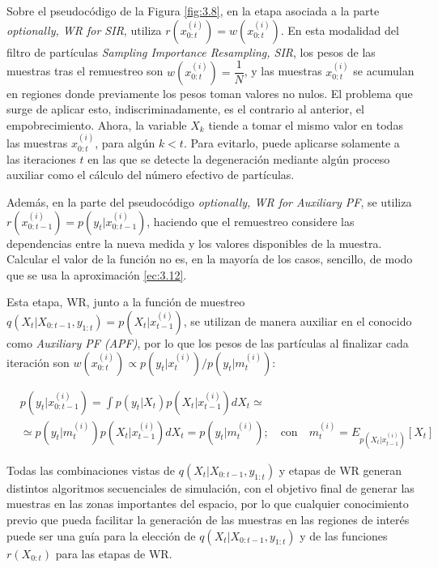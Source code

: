 Sobre el pseudocódigo de la Figura \ref{fig:3.8}, en la etapa asociada a la parte \textit{optionally, WR for SIR}, utiliza $r\left(x_{0:t}^{(i)}\right) = w\left(x_{0:t}^{(i)}\right)$. En esta modalidad del filtro de partículas \textit{Sampling Importance Resampling, SIR}, los pesos de las muestras tras el remuestreo son $w\left(x_{0:t}^{(i)}\right) = \dfrac{1}{N}$, y las muestras $x_{0:t}^{(i)}$ se acumulan en regiones donde previamente los pesos toman valores no nulos.
El problema que surge de aplicar esto, indiscriminadamente, es el contrario al anterior, el empobrecimiento. Ahora, la variable $X_k$ tiende a tomar el mismo valor en todas las muestras $x_{0:t}^{(i)}$, para algún $k < t$. Para evitarlo, puede aplicarse solamente a las iteraciones $t$ en las que se detecte la degeneración mediante algún proceso auxiliar como el cálculo del número efectivo de partículas.

Además, en la parte del pseudocódigo \textit{optionally, WR for Auxiliary PF}, se utiliza $r\left(x_{0:t-1}^{(i)}\right) = p\left(y_t|x_{0:t-1}^{(i)}\right)$, haciendo que el remuestreo considere las dependencias entre la nueva medida y los valores disponibles de la muestra. Calcular el valor de la función no es, en la mayoría de los casos, sencillo, de modo que se usa la aproximación \ref{ec:3.12}.

Esta etapa, WR, junto a la función de muestreo $q\left(X_{t}|X_{0:t-1},y_{1:t}\right) = p\left(X_t|x_{t-1}^{(i)}\right)$, se utilizan de manera auxiliar en el conocido como \textit{Auxiliary PF (APF)}, por lo que los pesos de las partículas al finalizar cada iteración son $w\left(x_{0:t}^{(i)}\right) \propto p\left(y_t|x_t^{(i)}\right)/ p\left(y_t|m_t^{(i)}\right)$:

\begin{equation}
    \begin{aligned}
        &p\left(y_t|x_{0:t-1}^{(i)}\right) = \int p\left(y_t|X_t\right)p\left(X_t|x_{t-1}^{(i)}\right)dX_t \simeq \\
        &\simeq p\left(y_t|m_t^{(i)}\right)p\left(X_t|x_{t-1}^{(i)}\right)dX_t = p\left(y_t|m_t^{(i)}\right) ; \quad \text{con} \quad m_t^{(i)} = E_{p\left(X_t|x_{t-1}^{(i)}\right)}[X_t]
    \end{aligned}
    \label{ec:3.12}
\end{equation}

Todas las combinaciones vistas de $q\left(X_{t}|X_{0:t-1},y_{1:t}\right)$ y etapas de WR generan distintos algoritmos secuenciales de simulación, con el objetivo final de generar las muestras en las zonas importantes del espacio, por lo que cualquier conocimiento previo que pueda facilitar la generación de las muestras en las regiones de interés puede ser una guía para la elección de $q\left(X_{t}|X_{0:t-1},y_{1:t}\right)$ y de las funciones $r\left(X_{0:t}\right)$ para las etapas de WR.

